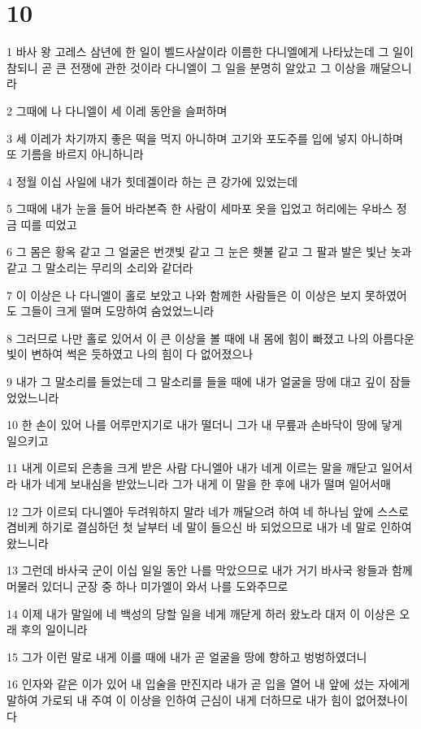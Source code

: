 \chapter{10}

\par 1 바사 왕 고레스 삼년에 한 일이 벨드사살이라 이름한 다니엘에게 나타났는데 그 일이 참되니 곧 큰 전쟁에 관한 것이라 다니엘이 그 일을 분명히 알았고 그 이상을 깨달으니라
\par 2 그때에 나 다니엘이 세 이레 동안을 슬퍼하며
\par 3 세 이레가 차기까지 좋은 떡을 먹지 아니하며 고기와 포도주를 입에 넣지 아니하며 또 기름을 바르지 아니하니라
\par 4 정월 이십 사일에 내가 힛데겔이라 하는 큰 강가에 있었는데
\par 5 그때에 내가 눈을 들어 바라본즉 한 사람이 세마포 옷을 입었고 허리에는 우바스 정금 띠를 띠었고
\par 6 그 몸은 황옥 같고 그 얼굴은 번갯빛 같고 그 눈은 횃불 같고 그 팔과 발은 빛난 놋과 같고 그 말소리는 무리의 소리와 같더라
\par 7 이 이상은 나 다니엘이 홀로 보았고 나와 함께한 사람들은 이 이상은 보지 못하였어도 그들이 크게 떨며 도망하여 숨었었느니라
\par 8 그러므로 나만 홀로 있어서 이 큰 이상을 볼 때에 내 몸에 힘이 빠졌고 나의 아름다운 빛이 변하여 썩은 듯하였고 나의 힘이 다 없어졌으나
\par 9 내가 그 말소리를 들었는데 그 말소리를 들을 때에 내가 얼굴을 땅에 대고 깊이 잠들었었느니라
\par 10 한 손이 있어 나를 어루만지기로 내가 떨더니 그가 내 무릎과 손바닥이 땅에 닿게 일으키고
\par 11 내게 이르되 은총을 크게 받은 사람 다니엘아 내가 네게 이르는 말을 깨닫고 일어서라 내가 네게 보내심을 받았느니라 그가 내게 이 말을 한 후에 내가 떨며 일어서매
\par 12 그가 이르되 다니엘아 두려워하지 말라 네가 깨달으려 하여 네 하나님 앞에 스스로 겸비케 하기로 결심하던 첫 날부터 네 말이 들으신 바 되었으므로 내가 네 말로 인하여 왔느니라
\par 13 그런데 바사국 군이 이십 일일 동안 나를 막았으므로 내가 거기 바사국 왕들과 함께 머물러 있더니 군장 중 하나 미가엘이 와서 나를 도와주므로
\par 14 이제 내가 말일에 네 백성의 당할 일을 네게 깨닫게 하러 왔노라 대저 이 이상은 오래 후의 일이니라
\par 15 그가 이런 말로 내게 이를 때에 내가 곧 얼굴을 땅에 향하고 벙벙하였더니
\par 16 인자와 같은 이가 있어 내 입술을 만진지라 내가 곧 입을 열어 내 앞에 섰는 자에게 말하여 가로되 내 주여 이 이상을 인하여 근심이 내게 더하므로 내가 힘이 없어졌나이다

